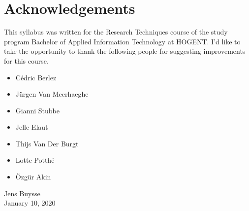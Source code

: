 

\chapter*{Acknowledgements}

This syllabus was written for the Research Techniques course of the study program Bachelor of Applied Information Technology at HOGENT. I'd like to take the opportunity to thank the following people for suggesting improvements for this course.

\begin{itemize}
	\item C\'edric Berlez
	\item J\"urgen Van Meerhaeghe
	\item Gianni Stubbe
	\item Jelle Elaut
	\item Thijs Van Der Burgt
	\item Lotte Potth\'e
	\item \"Ozg\"ur Akin
\end{itemize}

\bigskip \bigskip
{\raggedleft%
Jens Buysse\\
January 10, 2020\\
}
